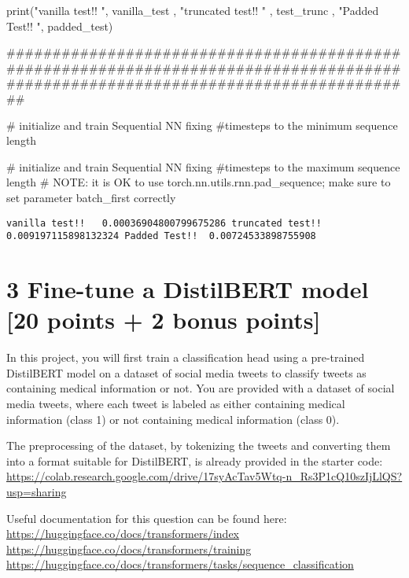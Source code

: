 \documentclass[
  letterpaper,
  DIV=11,
  numbers=noendperiod]{scrartcl}
\newenvironment{Shaded}{\begin{snugshade}}{\end{snugshade}}
\newcommand{\AlertTok}[1]{\textcolor[rgb]{0.68,0.00,0.00}{#1}}
\newcommand{\BuiltInTok}[1]{\textcolor[rgb]{0.00,0.23,0.31}{#1}}
\newcommand{\CommentTok}[1]{\textcolor[rgb]{0.37,0.37,0.37}{#1}}
\newcommand{\NormalTok}[1]{\textcolor[rgb]{0.00,0.23,0.31}{#1}}
\newcommand{\StringTok}[1]{\textcolor[rgb]{0.13,0.47,0.30}{#1}}
\begin{document}
\begin{Shaded}
\begin{Highlighting}[]
\BuiltInTok{print}\NormalTok{(}\StringTok{"vanilla test!!  "}\NormalTok{, vanilla\_test , }\StringTok{"truncated test!! "}\NormalTok{ , test\_trunc , }\StringTok{"Padded Test!! "}\NormalTok{, padded\_test)}


\CommentTok{\#\#\#\#\#\#\#\#\#\#\#\#\#\#\#\#\#\#\#\#\#\#\#\#\#\#\#\#\#\#\#\#\#\#\#\#\#\#\#\#\#\#\#\#\#\#\#\#\#\#\#\#\#\#\#\#\#\#\#\#\#\#\#\#\#\#\#\#\#\#\#\#\#\#\#\#\#\#\#\#\#\#\#\#\#\#\#\#\#\#\#\#\#\#\#\#\#\#\#\#\#\#\#\#\#\#\#\#\#\#\#\#\#\#\#\#\#\#\#\#\#\#\#\#\#\#\#\#\#\#\#}

\CommentTok{\# initialize and train Sequential NN fixing \#timesteps to the minimum sequence length}

\CommentTok{\# initialize and train Sequential NN fixing \#timesteps to the maximum sequence length}
\CommentTok{\# }\AlertTok{NOTE}\CommentTok{: it is OK to use torch.nn.utils.rnn.pad\_sequence; make sure to set parameter batch\_first correctly}
\end{Highlighting}
\end{Shaded}

\label{prob2}
\begin{verbatim}
vanilla test!!   0.00036904800799675286 truncated test!!  0.009197115898132324 Padded Test!!  0.00724533898755908
\end{verbatim}

\section{3 Fine-tune a DistilBERT model {[}20 points + 2 bonus
points{]}}\label{fine-tune-a-distilbert-model-20-points-2-bonus-points}

In this project, you will first train a classification head using a
pre-trained DistilBERT model on a dataset of social media tweets to
classify tweets as containing medical information or not. You are
provided with a dataset of social media tweets, where each tweet is
labeled as either containing medical information (class 1) or not
containing medical information (class 0).

The preprocessing of the dataset, by tokenizing the tweets and
converting them into a format suitable for DistilBERT, is already
provided in the starter code:
\url{https://colab.research.google.com/drive/17syAcTav5Wtq-n_Rs3P1cQ10szIjLlQS?usp=sharing}

Useful documentation for this question can be found here:
\url{https://huggingface.co/docs/transformers/index}
\url{https://huggingface.co/docs/transformers/training}
\url{https://huggingface.co/docs/transformers/tasks/sequence_classification}
\end{document}
